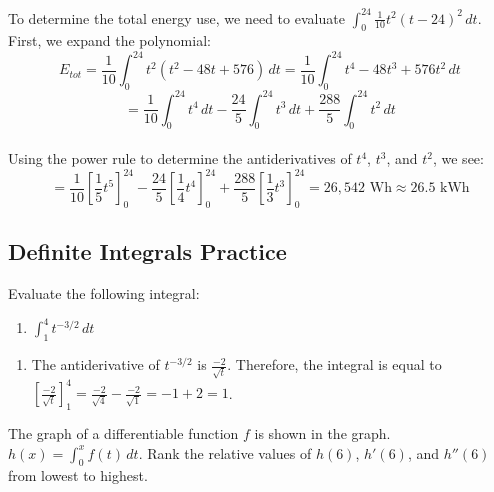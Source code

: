 To determine the total energy use, we need to evaluate $\int_{0}^{24} 
\frac{1}{10}t^2(t-24)^2\,dt$. First, we expand the polynomial:\\
$$E_{tot} = \frac{1}{10} \int_{0}^{24} t^2 (t^2-48t+576)\,dt = 
\frac{1}{10}\int_{0}^{24} t^4 - 48t^3 + 576t^2\,dt$$
$$= \frac{1}{10}\int_{0}^{24} t^4\,dt - \frac{24}{5}\int_{0}^{24} 
t^3\,dt + \frac{288}{5}\int_{0}^{24} t^2\,dt$$\\
Using the power rule to determine the antiderivatives of $t^4$, $t^3$, 
and $t^2$, we see:\\
$$=\frac{1}{10}\left[\frac{1}{5}t^5\right]_{0}^{24} - \frac{24}{5}
\left[\frac{1}{4}t^4\right]_{0}^{24} + \frac{288}{5}\left[\frac{1}{3}t^3\right]_{0}^{24} 
= 26{,}542 \text{ Wh} \approx 26.5 \text{ kWh}$$

\subsection{Definite Integrals Practice}
\begin{Exercise}[label=FTC2]
	Evaluate the following integral:
	\begin{enumerate}
	\item $\int_1^4 t^{-3/2}\,dt$
	\end{enumerate}
\end{Exercise}

\begin{Answer}[ref=FTC2]
	\begin{enumerate}
	\item The antiderivative of $t^{-3/2}$ is $\frac{-2}{\sqrt{t}}$. 
	Therefore, the integral is equal to $[\frac{-2}{\sqrt{t}}]_1^4 = 
	\frac{-2}{\sqrt{4}} - \frac{-2}{\sqrt{1}} = -1 + 2 = 1$. 
	\end{enumerate}
\end{Answer}

\begin{Exercise} The graph of a 
	differentiable function $f$ is shown in the graph. $h(x) = \int_0^x 
	f(t)\,dt$. Rank the relative values of $h(6)$, $h'(6)$, and $h''(6)$ 
	from lowest to highest.
	
\end{Exercise}

